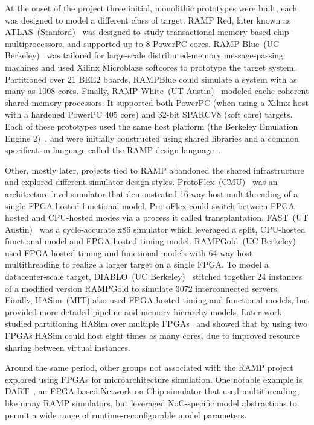 At the onset of the project three initial, monolithic prototypes were built,
each was designed to model a different class of target.
RAMP Red, later known as ATLAS~(Stanford)~\cite{ATLAS} was designed to study transactional-memory-based chip-multiprocessors, and supported up to 8 PowerPC cores.
RAMP Blue~(UC Berkeley)~\cite{RAMPBlue} was tailored for large-scale distributed-memory message-passing machines and used Xilinx
Microblaze softcores to prototype the target system. Partitioned over 21
BEE2 boards, RAMPBlue could simulate a system with as many as 1008 cores.
Finally, RAMP White~(UT Austin)~\cite{RAMPWhite} modeled cache-coherent
shared-memory processors. It supported both PowerPC (when using a Xilinx
host with a hardened PowerPC 405 core) and 32-bit SPARCV8 (soft core) targets.
Each of these prototypes used the same host platform (the Berkeley Emulation
Engine 2)~\cite{BEE2}, and were initially constructed using shared libraries and a common
specification language called the RAMP design language~\cite{RDL}.

Other, mostly later, projects tied to RAMP abandoned the shared infrastructure
and explored different simulator design styles.
ProtoFlex~(CMU)~\cite{ProtoFlex} was an architecture-level simulator that
demonstrated 16-way host-multithreading of a single FPGA-hosted functional
model.  ProtoFlex could switch between FPGA-hosted and CPU-hosted modes via
a process it called transplantation. FAST~(UT Austin)~\cite{FAST} was a cycle-accurate
x86 simulator which leveraged a split, CPU-hosted functional model and FPGA-hosted
timing model. RAMPGold~(UC Berkeley)~\cite{RAMPGold} used FPGA-hosted timing
and functional models with 64-way host-multithreading to realize a larger
target on a single FPGA.  To model a datacenter-scale target,
DIABLO~(UC Berkeley)~\cite{Diablo} stitched together 24 instances of a modified version RAMPGold to simulate 3072 interconnected
servers.  Finally, HASim~\cite{HASim}(MIT) also used FPGA-hosted timing and
functional models, but provided more detailed pipeline and memory hierarchy
models. Later work studied partitioning HASim over multiple FPGAs~\cite{LIFPGADesign} and showed that by using two FPGAs HASim could host eight
times as many cores, due to improved resource sharing between virtual
instances.

Around the same period, other groups not associated with the RAMP project explored
using FPGAs for microarchitecture simulation.  One notable example is
DART~\cite{DART}, an FPGA-based Network-on-Chip simulator that used
multithreading, like many RAMP simulators, but leveraged NoC-specific model abstractions
to permit a wide range of runtime-reconfigurable model parameters.

